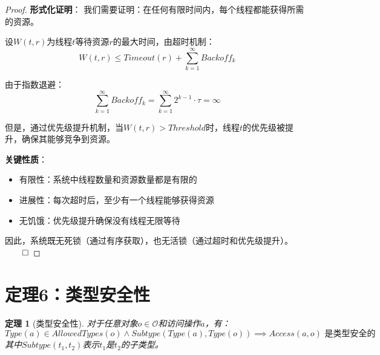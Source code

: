 \documentclass{article}
\newtheorem{theorem}{定理}[section]
\theoremstyle{definition}
\theoremstyle{remark}
\begin{document}
\begin{proof}
    \textbf{形式化证明}：
    我们需要证明：在任何有限时间内，每个线程都能获得所需的资源。

    设$W(t, r)$为线程$t$等待资源$r$的最大时间，由超时机制：
    \[
    W(t, r) \leq Timeout(r) + \sum_{k=1}^{\infty} Backoff_k
    \]

    由于指数退避：
    \[
    \sum_{k=1}^{\infty} Backoff_k = \sum_{k=1}^{\infty} 2^{k-1} \cdot \tau = \infty
    \]

    但是，通过优先级提升机制，当$W(t, r) > Threshold$时，线程$t$的优先级被提升，确保其能够竞争到资源。

    \textbf{关键性质}：
    \begin{itemize}
        \item 有限性：系统中线程数量和资源数量都是有限的
        \item 进展性：每次超时后，至少有一个线程能够获得资源
        \item 无饥饿：优先级提升确保没有线程无限等待
    \end{itemize}

    因此，系统既无死锁（通过有序获取），也无活锁（通过超时和优先级提升）。$\qed$
\end{proof}

\section{定理6：类型安全性}

\begin{theorem}[类型安全性]
    对于任意对象$o \in \mathcal{O}$和访问操作$a$，有：
    \[
    Type(a) \in AllowedTypes(o) \land Subtype(Type(a), Type(o)) \implies Access(a, o) \text{ 是类型安全的}
    \]
    其中$Subtype(t_1, t_2)$表示$t_1$是$t_2$的子类型。
\end{theorem}
\end{document}
